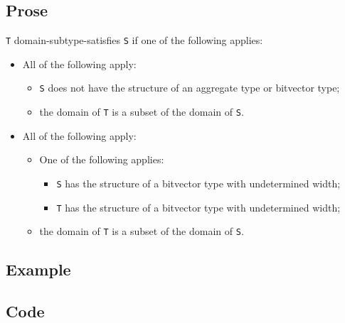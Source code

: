 \documentclass{book}
\begin{document}
\subsection{Prose}
 \texttt{T} domain-subtype-satisfies \texttt{S} if one of the following applies:
 \begin{itemize}
 \item All of the following apply:
    \begin{itemize}
    \item \texttt{S} does not have the structure of an aggregate type or bitvector type;
    \item the domain of \texttt{T} is a subset of the domain of \texttt{S}.
    \end{itemize}

  \item All of the following apply:
  \begin{itemize}
    \item One of the following applies:
      \begin{itemize}
      \item \texttt{S} has the structure of a bitvector type with undetermined width;
      \item \texttt{T} has the structure of a bitvector type with undetermined width;
      \end{itemize}
   \item the domain of \texttt{T} is a subset of the domain of \texttt{S}.
   \end{itemize}
  \end{itemize}

  \subsection{Example}

  \subsection{Code}
\end{document}
